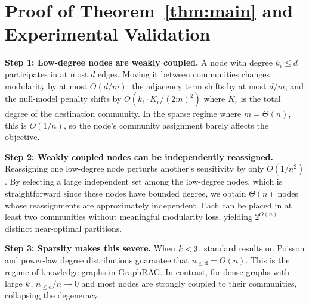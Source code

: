 
\section{Proof of Theorem~\ref{thm:main} and Experimental Validation}\label{app:proof}


\noindent\textbf{Step 1: Low-degree nodes are weakly coupled.}
A node with degree $k_i \leq d$ participates in at most $d$ edges. Moving it between communities changes modularity by at most $O(d/m)$: the adjacency term shifts by at most $d/m$, and the null-model penalty shifts by $O(k_i \cdot K_r/(2m)^2)$ where $K_r$ is the total degree of the destination community. In the sparse regime where $m = \Theta(n)$, this is $O(1/n)$, so the node's community assignment barely affects the objective.

\medskip
\noindent\textbf{Step 2: Weakly coupled nodes can be independently reassigned.}
Reassigning one low-degree node perturbs another's sensitivity by only $O(1/n^2)$. By selecting a large independent set among the low-degree nodes, which is straightforward since these nodes have bounded degree, we obtain $\Theta(n)$ nodes whose reassignments are approximately independent. Each can be placed in at least two communities without meaningful modularity loss, yielding $2^{\Theta(n)}$ distinct near-optimal partitions.

\medskip
\noindent\textbf{Step 3: Sparsity makes this severe.}
When $\bar{k} < 3$, standard results on Poisson and power-law degree distributions guarantee that $n_{\mathrm{\le d}} = \Theta(n)$. This is the regime of knowledge graphs in GraphRAG. In contrast, for dense graphs with large $\bar{k}$, $n_{\mathrm{\le d}}/n \to 0$ and most nodes are strongly coupled to their communities, collapsing the degeneracy.\\


